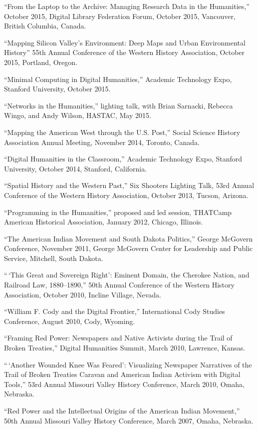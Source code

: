 ``From the Laptop to the Archive: Managing Research Data in the
Humanities,'' October 2015, Digital Library Federation Forum, October
2015, Vancouver, British Columbia, Canada.

``Mapping Silicon Valley's Environment: Deep Maps and Urban
Environmental History'' 55th Annual Conference of the Western History
Association, October 2015, Portland, Oregon.

``Minimal Computing in Digital Humanities,'' Academic Technology Expo,
Stanford University, October 2015.

``Networks in the Humanities,'' lighting talk, with Brian Sarnacki,
Rebecca Wingo, and Andy Wilson, HASTAC, May 2015.

``Mapping the American West through the U.S. Post,'' Social Science
History Association Annual Meeting, November 2014, Toronto, Canada.

``Digital Humanities in the Classroom,'' Academic Technology Expo,
Stanford University, October 2014, Stanford, California.

``Spatial History and the Western Past,'' Six Shooters Lighting Talk,
53rd Annual Conference of the Western History Association, October 2013,
Tucson, Arizona.

``Programming in the Humanities,'' proposed and led session, THATCamp
American Historical Association, January 2012, Chicago, Illinois.

``The American Indian Movement and South Dakota Politics,'' George
McGovern Conference, November 2011, George McGovern Center for
Leadership and Public Service, Mitchell, South Dakota.

``\,`This Great and Sovereign Right': Eminent Domain, the Cherokee
Nation, and Railroad Law, 1880--1890,'' 50th Annual Conference of the
Western History Association, October 2010, Incline Village, Nevada.

``William F. Cody and the Digital Frontier,'' International Cody Studies
Conference, August 2010, Cody, Wyoming.

``Framing Red Power: Newspapers and Native Activists during the Trail of
Broken Treaties,'' Digital Humanities Summit, March 2010, Lawrence,
Kansas.

``\,`Another Wounded Knee Was Feared': Visualizing Newspaper Narratives
of the Trail of Broken Treaties Caravan and American Indian Activism
with Digital Tools,'' 53rd Annual Missouri Valley History Conference,
March 2010, Omaha, Nebraska.

``Red Power and the Intellectual Origins of the American Indian
Movement,'' 50th Annual Missouri Valley History Conference, March 2007,
Omaha, Nebraska.

